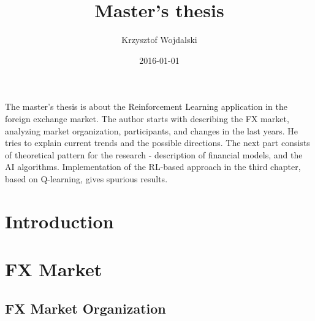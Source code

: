 \documentclass{pracamgr_wne}\usepackage[]{graphicx}\usepackage[]{color}
\author{Krzysztof Wojdalski}
\title{Master's thesis}
\date{2016-01-01}
\begin{document}
\maketitle


\begin{summary}

The master's thesis is about the Reinforcement Learning application in the foreign exchange market. 
The author starts with describing the FX market, analyzing market organization, participants, and changes in the last
years. He tries to explain current trends and the possible directions. 
The next part consists of theoretical pattern for the research - description of financial models, 
and the AI algorithms. 
Implementation of the RL-based approach in the third chapter, based on Q-learning, gives spurious results. 


\end{summary}

\tableofcontents



\chapter{Introduction}




\chapter{FX Market}





\section{FX Market Organization}
\end{document}
